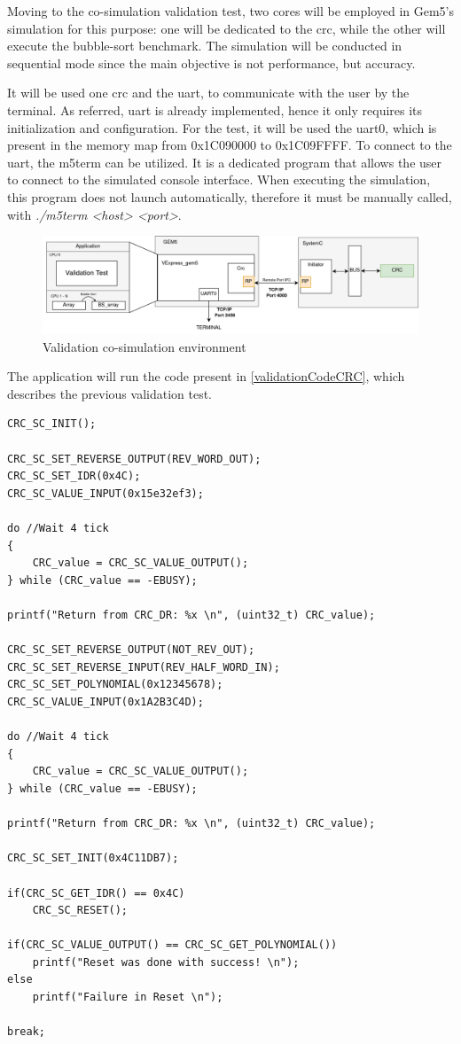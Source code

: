 Moving to the co-simulation validation test, two cores will be employed in Gem5's simulation for this purpose: one will be dedicated to the 
\gls{crc}, while the other will execute the bubble-sort benchmark. The simulation will be conducted in sequential mode since 
the main objective is not performance, but accuracy.

It will be used one \gls{crc} and the \gls{uart}, to communicate with the user by the terminal.
As referred, \gls{uart} is already implemented, hence it only requires its initialization and configuration. For the test, it will be used the 
\gls{uart}0, which is present in the memory map from 0x1C090000 to 0x1C09FFFF.
To connect to the \gls{uart}, the m5term can be utilized. It is
a dedicated program that allows the user to connect to the simulated console interface. When executing the simulation, this program does not
launch automatically, therefore it must be manually called, with \textit{./m5term <host> <port>}.

\begin{figure}[H]
	\centering
 	\includegraphics[width=1\linewidth]{Images/CoSimDesign_Validation.png} 
 	\caption{Validation co-simulation environment}
	\label{fig_CoSimDesign_Validation}
\end{figure}

The application will run the code present in \ref{validationCodeCRC}, which describes the previous validation test. 

\newpage

\begin{lstlisting}[style=customC, caption={CRC validation code}, label=validationCodeCRC]
CRC_SC_INIT();

CRC_SC_SET_REVERSE_OUTPUT(REV_WORD_OUT);
CRC_SC_SET_IDR(0x4C);
CRC_SC_VALUE_INPUT(0x15e32ef3);       

do //Wait 4 tick
{
	CRC_value = CRC_SC_VALUE_OUTPUT();
} while (CRC_value == -EBUSY);

printf("Return from CRC_DR: %x \n", (uint32_t) CRC_value);

CRC_SC_SET_REVERSE_OUTPUT(NOT_REV_OUT);
CRC_SC_SET_REVERSE_INPUT(REV_HALF_WORD_IN);
CRC_SC_SET_POLYNOMIAL(0x12345678);
CRC_SC_VALUE_INPUT(0x1A2B3C4D);

do //Wait 4 tick
{
	CRC_value = CRC_SC_VALUE_OUTPUT();
} while (CRC_value == -EBUSY);

printf("Return from CRC_DR: %x \n", (uint32_t) CRC_value); 

CRC_SC_SET_INIT(0x4C11DB7);

if(CRC_SC_GET_IDR() == 0x4C)
	CRC_SC_RESET();

if(CRC_SC_VALUE_OUTPUT() == CRC_SC_GET_POLYNOMIAL())
	printf("Reset was done with success! \n");
else
	printf("Failure in Reset \n");

break;
\end{lstlisting}

